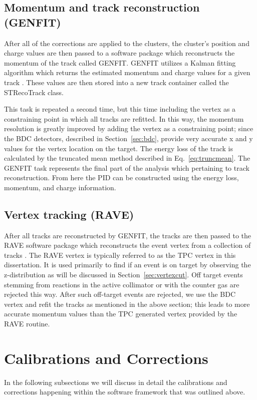 \subsection{Momentum and track reconstruction (GENFIT)}
After all of the corrections are applied to the clusters, the cluster's position and charge values are then passed to a software package which reconstructs the momentum of the track called GENFIT. GENFIT utilizes a Kalman fitting algorithm which returns the estimated momentum and charge values for a given track \cite{genfit}. These values are then stored into a new track container called the STRecoTrack class. 

This task is repeated a second time, but this time including the vertex as a constraining point in which all tracks are refitted. In this way, the momentum resolution is greatly improved by adding the vertex as a constraining point; since the BDC detectors, described in Section~\ref{sec:bdc}, provide very accurate x and y values for the vertex location on the target. The energy loss of the track is calculated by the truncated mean method described in Eq.~\ref{eq:truncmean}. The GENFIT task represents the final part of the analysis which pertaining to track reconstruction. From here the PID can be constructed using the energy loss, momentum, and charge information. 

\subsection{Vertex tracking (RAVE)}
\label{sec:vertex}
After all tracks are reconstructed by GENFIT, the tracks are then passed to the RAVE software package which reconstructs the event vertex from a collection of tracks \cite{rave}.  The RAVE vertex is typically referred to as the TPC vertex in this dissertation. It is used primarily to find if an event is on target by observing the z-distribution as will be discussed in Section~\ref{sec:vertexcut}. Off target events stemming from reactions in the active collimator or with the counter gas are rejected this way. After such off-target events are rejected,  we use the BDC vertex and refit the tracks as mentioned in the above section; this leads to more accurate momentum values than the TPC generated vertex provided by the RAVE routine. 



\section{Calibrations and Corrections}
In the following subsections we will discuss in detail the calibrations and corrections happening within the software framework that was outlined above.  

